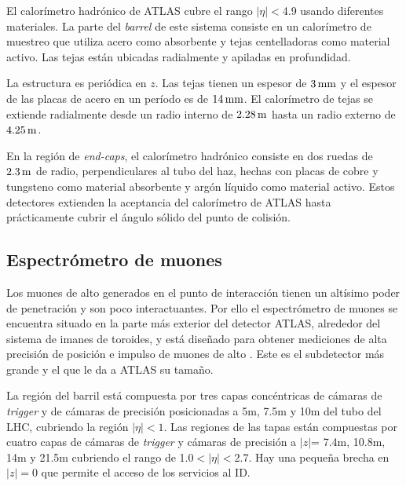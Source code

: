 El calorímetro hadrónico de ATLAS \cite{calohadTDR} cubre el rango $|\eta|<$4.9
usando diferentes materiales.
La parte del \emph{barrel} de este sistema consiste en un calorímetro de muestreo que
utiliza acero como absorbente y tejas centelladoras como material activo. Las
tejas están ubicadas radialmente y apiladas en profundidad.

La estructura es periódica en $z$. Las tejas tienen un espesor de $\unit[3]{mm}$ y el
espesor de las placas de acero en un período es de $\unit[14]{mm}$.
El calorímetro de tejas se extiende radialmente desde un radio interno de $\unit[2.28]{m}$
hasta un radio externo de $\unit[4.25]{m}$.

En la región de \emph{end-caps}, el calorímetro hadrónico consiste en dos ruedas de
$\unit[2.3]{m}$ de radio, perpendiculares al tubo del haz, hechas con placas de cobre y
tungsteno como material absorbente y argón líquido como material activo. Estos
detectores extienden la aceptancia del calorímetro de ATLAS hasta prácticamente
cubrir el ángulo sólido del punto de colisión.


\subsection{Espectrómetro de muones}
\label{sec:espectrometro_muones}

Los muones de alto {\pt} generados en el punto de interacción tienen un altísimo
poder de penetración y son poco interactuantes. Por ello el espectrómetro de
muones \cite{muonTDR} se encuentra situado en la parte más exterior del detector
ATLAS, alrededor del sistema de imanes de toroides, y está diseñado para obtener
mediciones de alta precisión de posición e impulso de muones de alto \pt.
Este es el subdetector más grande y el que le da a ATLAS su tamaño.



La región del barril está compuesta por tres capas concéntricas de cámaras de
\emph{trigger} y de cámaras de precisión posicionadas a 5m, 7.5m y 10m del tubo del
LHC, cubriendo la región $|\eta|<1$. Las regiones de las tapas están compuestas
por cuatro capas de cámaras de \emph{trigger} y cámaras de precisión a $|z|$= 7.4m,
10.8m, 14m y 21.5m cubriendo el rango de 1.0$<|\eta|<$2.7. Hay una pequeña
brecha en $|z|=0$ que permite el acceso de los servicios al ID.

